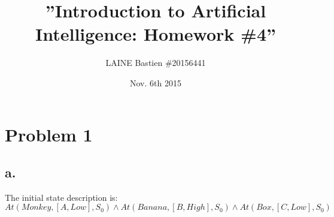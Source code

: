 \documentclass{article}
\begin{document}
\title{\textbf{''Introduction to Artificial Intelligence: Homework \#4''}}
\author{LAINE Bastien \#20156441}
\date{Nov. 6th 2015}
\maketitle
\tableofcontents

\newpage
    \section{Problem 1}
        \subsection{a.}
            The initial state description is:\\
            $At(Monkey,[A,Low],S_0)\land At(Banana,[B,High],S_0)\land At(Box,[C,Low],S_0)$
\end{document}
